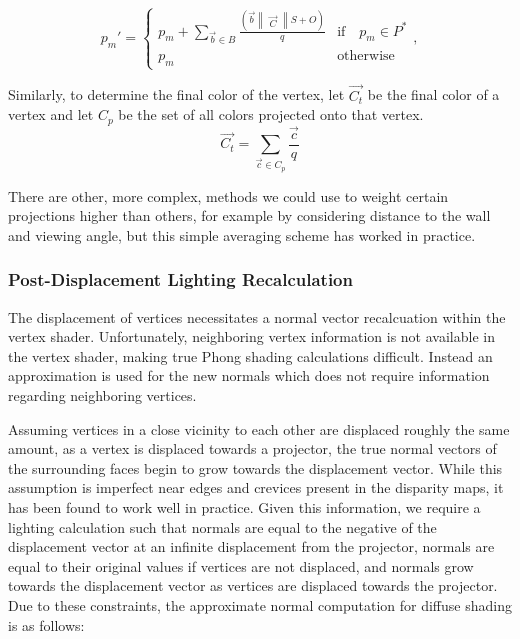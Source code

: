 \documentclass[a4paper,twoside]{article}
\begin{document}
\begin{equation}
p_{m}' = \left \{ 
\begin{array}{ll}
p_{m} + \sum\limits_{\vec{b} \in B} \frac{(\vec{b} \begin{Vmatrix}\vec{C}\end{Vmatrix} S + O)}{q} & \text{if} \quad p_{m} \in P^{*}\\
p_{m} & \text{otherwise}
\end{array},\right.
\label{eq:displaceBlend}
\end{equation}

Similarly, to determine the final color of the vertex, let $\vec{C_t}$ be the final color of a vertex and let $C_p$ be the set of all colors projected onto that vertex. 
\begin{equation}
\vec{C_t} = \sum\limits_{\vec{c} \in C_p} \frac{\vec{c}}{q} 
\label{eq:colorBlend}
\end{equation}

There are other, more complex, methods we could use to weight certain projections higher than others, for example by considering distance to the wall and viewing angle, but this simple averaging scheme has worked in practice. 
 
 \subsubsection{Post-Displacement Lighting Recalculation}
 
 The displacement of vertices necessitates a normal vector recalcuation within the vertex shader. Unfortunately, neighboring vertex information is not available in the vertex shader, making true Phong shading calculations difficult. Instead an approximation is used for the new normals which does not require information regarding neighboring vertices.

Assuming vertices in a close vicinity to each other are displaced roughly the same amount, as a vertex is displaced towards a projector, the true normal vectors of the surrounding faces begin to grow towards the displacement vector. While this assumption is imperfect near edges and crevices present in the disparity maps, it has been found to work well in practice. 
Given this information, we require a lighting calculation such that normals are equal to the negative of the displacement vector at an infinite displacement from the projector, normals are equal to their original values if vertices are not displaced, and normals grow towards the displacement vector as vertices are displaced towards the projector. Due to these constraints, the approximate normal computation for diffuse shading is as follows:
\end{document}
